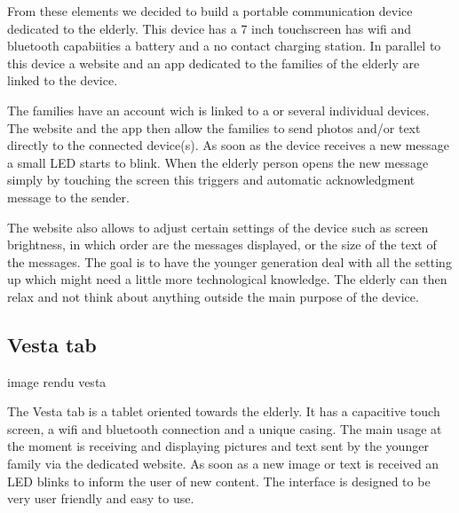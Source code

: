 From these elements we decided to build a portable communication device dedicated to the elderly. This device has a 7 inch touchscreen has wifi and bluetooth
capabiities a battery and a no contact charging station. In parallel to this device a website and an app dedicated to the families of the elderly are linked to the device.

The families have an account wich is linked to a or several individual devices. The website and the app then allow the families to send photos and/or text directly to the connected device(s).
As soon as the device receives a new message a small LED starts to blink. When the elderly person opens the new message simply by touching the screen this triggers and automatic acknowledgment message to the sender.

The website also allows to adjust certain settings of the device such as screen brightness, in which order are the messages displayed, or the size of the text of the messages. The goal is to have the younger generation deal with all the setting up which might need a little more technological knowledge. The elderly can then relax and not think about anything outside the main purpose of the device.

\subsection{Vesta tab}
          image rendu vesta

The Vesta tab is a tablet oriented towards the elderly. It has a capacitive touch screen, a wifi and bluetooth connection and a unique casing. The main usage at the moment is receiving and displaying pictures and text sent by the younger family via the dedicated website. As soon as a new image or text is received an LED blinks to inform the user of new content. The interface is designed to be very user friendly and easy to use.
